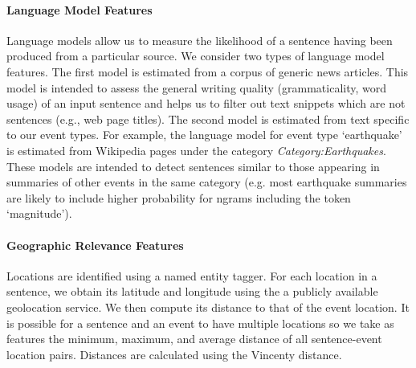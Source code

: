 \paragraph{Language Model Features}\label{subsubsec:lm}
Language models allow us to measure the likelihood of a sentence having been produced from a particular source.  We consider two types of language model features.  The first model is estimated from a corpus of generic news articles.  This model is intended to assess the general writing quality (grammaticality, word usage) of an input sentence and helps us to filter out text snippets which are not sentences (e.g., web page titles).  The second model is estimated from text specific to our event types.  For example, the language model for event type `earthquake' is estimated from Wikipedia pages under the category \emph{Category:Earthquakes}.  These models are intended to detect sentences similar to those appearing in summaries of other events in the same category (e.g. most earthquake summaries are likely to include higher probability for ngrams including the token `magnitude').  



\paragraph{Geographic Relevance Features}

Locations are identified using a named entity tagger. For each location in a sentence, we obtain its latitude and longitude using the a publicly available geolocation service.  We then compute its distance to that of the event location.  It is possible for a sentence and an event to have multiple locations so we take as features the minimum, maximum, and average distance of all sentence-event location pairs.  Distances are calculated using the Vincenty distance. 

